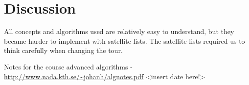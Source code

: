 \documentclass[paper=a4, fontsize=11pt,numbers=endperiod]{scrartcl} %
\numberwithin{equation}{section} %
\numberwithin{figure}{section} %
\numberwithin{table}{section} %
\begin{document}
\section{Discussion}


All concepts and algorithms used are relatively easy to understand, but they became harder to implement with satellite lists. The satellite lists required us to think carefully when changing the tour.




\newpage
\begin{thebibliography}{9}

 Notes for the course advanced algorithms - \url{http://www.nada.kth.se/~johanh/algnotes.pdf} <insert date here!>
 
\end{thebibliography}
\end{document}
